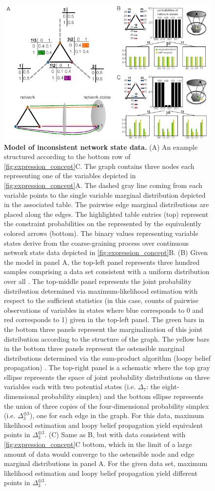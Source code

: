 \begin{figure}[!ht]
\centering
\noindent\includegraphics[width=0.9\columnwidth]{fig/inconsistentthreecycle.pdf}
\caption{{\bf Model of inconsistent network state data.} (A) An example structured according to the bottom row of \ref{fig:expression_concept}C. The graph contains three nodes each representing one of the variables depicted in \ref{fig:expression_concept}A. The dashed gray line coming from each variable points to the single variable marginal distribution depicted in the associated table. The pairwise edge marginal distributions are placed along the edges. The highlighted table entries (top) represent the constraint probabilities on the \gnpm{} represented by the equivalently colored arrows (bottom). The binary values representing variable states derive from the coarse-graining process over continuous network state data depicted in \ref{fig:expression_concept}B. (B) Given the model in panel A, the top-left panel represents three hundred samples comprising a data set consistent with a uniform distribution over all \gnpm{}. The top-middle panel represents the joint probability distribution determined via maximum-likelihood estimation with respect to the sufficient statistics (in this case, counts of pairwise observations of variables in states where blue corresponds to 0 and red corresponds to 1) given in the top-left panel. The green bars in the bottom three panels represent the marginalization of this joint distribution according to the structure of the graph. The yellow bars in the bottom three panels represent the ostensible marginal distributions determined via the sum-product algorithm (loopy belief propagation) \cite{Barber2012}. The top-right panel is a schematic where the top gray ellipse represents the space of joint probability distributions on three variables each with two potential states (i.e. $\Delta_7$: the eight-dimensional probability simplex) and the bottom ellipse represents the union of three copies of the four-dimensional probability simplex (i.e. $\Delta_3^{\oplus 3}$), one for each edge in the graph.  For this data, maximum likelihood estimation and loopy belief propagation yield equivalent points in $\Delta_3^{\oplus 3}$. (C) Same as B, but with data consistent with \ref{fig:expression_concept}C bottom, which in the limit of a large amount of data would converge to the ostensible node and edge marginal distributions in panel A. For the given data set, maximum likelihood estimation and loopy belief propagation yield different points in $\Delta_3^{\oplus 3}$.}

\end{figure}
